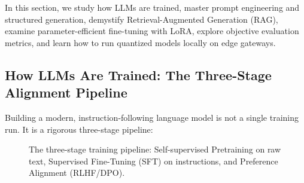 In this section, we study how LLMs are trained, master prompt engineering and structured generation, demystify Retrieval-Augmented Generation (RAG), examine parameter-efficient fine-tuning with LoRA, explore objective evaluation metrics, and learn how to run quantized models locally on edge gateways.

\subsection{How LLMs Are Trained: The Three-Stage Alignment Pipeline}\label{subsec:llm_training}

Building a modern, instruction-following language model is not a single training run. It is a rigorous three-stage pipeline:

\begin{figure}[htbp]
\centering
{}
\caption{The three-stage training pipeline: Self-supervised Pretraining on raw text, Supervised Fine-Tuning (SFT) on instructions, and Preference Alignment (RLHF/DPO).}\label{fig:llm_pipeline}
\end{figure}

